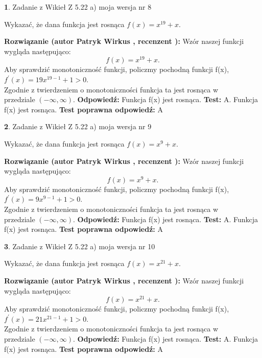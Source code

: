 \documentclass[12pt, a4paper]{article}
\theoremstyle{definition} %
\newtheorem{zad}{}
\newcommand{\zadStart}[1]{\begin{zad}#1\newline}
\newcommand{\zadStop}{\end{zad}}
\newcommand{\rozwStart}[2]{\noindent \textbf{Rozwiązanie (autor #1 , recenzent #2): }\newline}
\newcommand{\rozwStop}{\newline}
\newcommand{\odpStart}{\noindent \textbf{Odpowiedź:}\newline}
\newcommand{\odpStop}{\newline}
\newcommand{\testStart}{\noindent \textbf{Test:}\newline}
\newcommand{\testStop}{\newline}
\newcommand{\kluczStart}{\noindent \textbf{Test poprawna odpowiedź:}\newline}
\newcommand{\kluczStop}{\newline}
\begin{document}
\zadStart{Zadanie z Wikieł Z 5.22 a) moja wersja nr 8}

Wykazać, że dana funkcja jest rosnąca $f(x) = x^{19}+x$.
\zadStop
\rozwStart{Patryk Wirkus}{}
Wzór naszej funkcji wygląda następująco:
$$f(x) = x^{19}+x.$$
Aby sprawdzić monotoniczność funkcji, policzmy pochodną funkcji f(x),\\ $f^{'}(x) = 19x^{19-1}+1 > 0$.\\
Zgodnie z twierdzeniem o monotoniczności funkcja ta jest rosnąca w\\ przedziale $(-\infty,\infty)$.
\rozwStop
\odpStart
Funkcja f(x) jest rosnąca.
\odpStop
\testStart
A. Funkcja f(x) jest rosnąca.
\testStop
\kluczStart
A
\kluczStop



\zadStart{Zadanie z Wikieł Z 5.22 a) moja wersja nr 9}

Wykazać, że dana funkcja jest rosnąca $f(x) = x^{9}+x$.
\zadStop
\rozwStart{Patryk Wirkus}{}
Wzór naszej funkcji wygląda następująco:
$$f(x) = x^{9}+x.$$
Aby sprawdzić monotoniczność funkcji, policzmy pochodną funkcji f(x),\\ $f^{'}(x) = 9x^{9-1}+1 > 0$.\\
Zgodnie z twierdzeniem o monotoniczności funkcja ta jest rosnąca w\\ przedziale $(-\infty,\infty)$.
\rozwStop
\odpStart
Funkcja f(x) jest rosnąca.
\odpStop
\testStart
A. Funkcja f(x) jest rosnąca.
\testStop
\kluczStart
A
\kluczStop



\zadStart{Zadanie z Wikieł Z 5.22 a) moja wersja nr 10}

Wykazać, że dana funkcja jest rosnąca $f(x) = x^{21}+x$.
\zadStop
\rozwStart{Patryk Wirkus}{}
Wzór naszej funkcji wygląda następująco:
$$f(x) = x^{21}+x.$$
Aby sprawdzić monotoniczność funkcji, policzmy pochodną funkcji f(x),\\ $f^{'}(x) = 21x^{21-1}+1 > 0$.\\
Zgodnie z twierdzeniem o monotoniczności funkcja ta jest rosnąca w\\ przedziale $(-\infty,\infty)$.
\rozwStop
\odpStart
Funkcja f(x) jest rosnąca.
\odpStop
\testStart
A. Funkcja f(x) jest rosnąca.
\testStop
\kluczStart
A
\kluczStop
\end{document}
